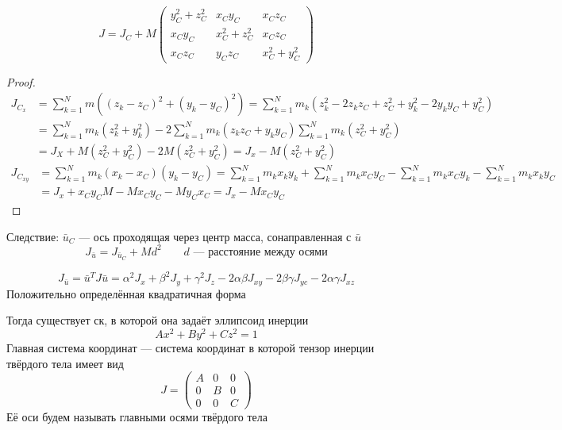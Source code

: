 \documentclass[crop=false]{standalone}
\begin{document}
\begin{theorem}

\end{theorem}
\[J = J_C + M \begin{pmatrix}
    y_C^2 + z_C^2  & x_C y_C & x_C z_C \\ x_C y_C & x_C^2 + z_C^2 & x_C z_C \\ x_C z_C & y_C z_C & x_C^2 + y_C^2
\end{pmatrix}\]
\begin{proof}
    \[
    \begin{aligned}
        J_{C_x} &= \sum_{k=1}^{N} m \left((z_k - z_C)^2 + (y_k - y_C)^2\right) = \sum_{k=1}^{N} m_k (z_k^2 - 2 z_k z_C + z_C^2 + y_k^2 - 2 y_k y_C + y_C^2) \\
        &= \sum_{k=1}^{N} m_k (z_k^2 + y_k^2) - 2\sum_{k=1}^{N} m_k(z_k z_C + y_k y_C) \sum_{k=1}^{N} m_k (z_C^2 + y_C^2) \\
        &= J_X + M (z_C^2 + y_C^2) -2 M (z_C^2 + y_C^2) = J_x - M(z_C^2 + y_C^2)
    \end{aligned}
    \]
    \[
    \begin{aligned}
    J_{C_{x y}} &= \sum_{k=1}^{N} m_k (x_k - x_C) (y_k - y_C) = \sum_{k=1}^{N} m_k x_k y_k + \sum_{k=1}^{N} m_k x_C y_C - \sum_{k=1}^{N} m_k x_C y_k - \sum_{k=1}^{N} m_k x_k y_C \\
    &= J_x + x_C y_C M - M x_C y_C - M y_C x_C = J_x - M x_C y_C
    \end{aligned}
    \]
\end{proof}
Следствие: $\bar u_C$ — ось проходящая через центр масса, сонаправленная с $\bar u$
\[J_{\bar u} = J_{\bar u_C} + M d^2 \qquad d \text{ — расстояние между осями}\]

\noindent\keypoint \[J_{\bar u} = \bar u ^T J \bar u = \alpha^2 J_x + \beta^2 J_y + \gamma^2 J_z -2 \alpha \beta J_{xy} - 2 \beta \gamma J_{yc} - 2\alpha \gamma J_{xz}\]
\keypoint Положительно определённая квадратичная форма %

\Def Тогда существует ск, в которой она задаёт эллипсоид инерции
\[A x^2 + B y^2 + C z^2 = 1 \]
\Def Главная система координат — система координат в которой тензор инерции твёрдого тела имеет вид 
\[J = \begin{pmatrix}
    A & 0& 0\\0 & B & 0\\ 0&0& C 
\end{pmatrix}\]
Её оси будем называть главными осями твёрдого тела
\end{document}
